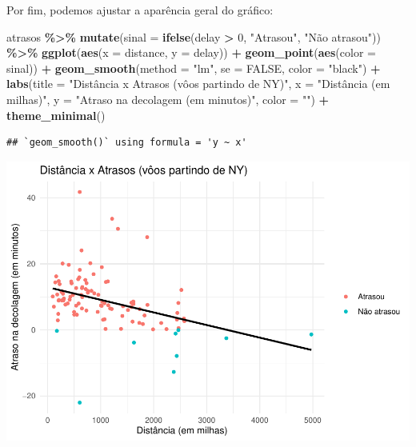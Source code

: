 \documentclass[
]{book}
\newenvironment{Shaded}{\begin{snugshade}}{\end{snugshade}}
\newcommand{\AttributeTok}[1]{\textcolor[rgb]{0.13,0.29,0.53}{#1}}
\newcommand{\ConstantTok}[1]{\textcolor[rgb]{0.56,0.35,0.01}{#1}}
\newcommand{\DecValTok}[1]{\textcolor[rgb]{0.00,0.00,0.81}{#1}}
\newcommand{\FunctionTok}[1]{\textcolor[rgb]{0.13,0.29,0.53}{\textbf{#1}}}
\newcommand{\NormalTok}[1]{#1}
\newcommand{\SpecialCharTok}[1]{\textcolor[rgb]{0.81,0.36,0.00}{\textbf{#1}}}
\newcommand{\StringTok}[1]{\textcolor[rgb]{0.31,0.60,0.02}{#1}}
\begin{document}
Por fim, podemos ajustar a aparência geral do gráfico:

\begin{Shaded}
\begin{Highlighting}[]
\NormalTok{atrasos }\SpecialCharTok{\%\textgreater{}\%} 
  \FunctionTok{mutate}\NormalTok{(}\AttributeTok{sinal =} \FunctionTok{ifelse}\NormalTok{(delay }\SpecialCharTok{\textgreater{}} \DecValTok{0}\NormalTok{, }\StringTok{"Atrasou"}\NormalTok{, }\StringTok{"Não atrasou"}\NormalTok{)) }\SpecialCharTok{\%\textgreater{}\%}
  \FunctionTok{ggplot}\NormalTok{(}\FunctionTok{aes}\NormalTok{(}\AttributeTok{x =}\NormalTok{ distance, }\AttributeTok{y =}\NormalTok{ delay)) }\SpecialCharTok{+}
  \FunctionTok{geom\_point}\NormalTok{(}\FunctionTok{aes}\NormalTok{(}\AttributeTok{color =}\NormalTok{ sinal)) }\SpecialCharTok{+}
  \FunctionTok{geom\_smooth}\NormalTok{(}\AttributeTok{method =} \StringTok{"lm"}\NormalTok{,}
              \AttributeTok{se =} \ConstantTok{FALSE}\NormalTok{,}
              \AttributeTok{color =} \StringTok{"black"}\NormalTok{) }\SpecialCharTok{+}
  \FunctionTok{labs}\NormalTok{(}\AttributeTok{title =} \StringTok{"Distância x Atrasos (vôos partindo de NY)"}\NormalTok{,}
       \AttributeTok{x =} \StringTok{"Distância (em milhas)"}\NormalTok{,}
       \AttributeTok{y =} \StringTok{"Atraso na decolagem (em minutos)"}\NormalTok{,}
       \AttributeTok{color =} \StringTok{""}\NormalTok{) }\SpecialCharTok{+}
  \FunctionTok{theme\_minimal}\NormalTok{()}
\end{Highlighting}
\end{Shaded}

\begin{verbatim}
## `geom_smooth()` using formula = 'y ~ x'
\end{verbatim}

\includegraphics{AprendendoR_files/figure-latex/unnamed-chunk-63-1.pdf}
\end{document}
